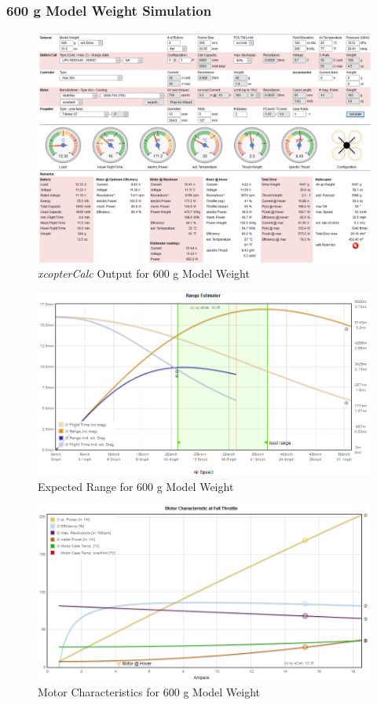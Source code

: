 \subsubsection{600 g Model Weight Simulation}

\begin{figure}[H]
\centering
\includegraphics[width=16.5cm]{img/600g_sim.png}
\caption{\textit{xcopterCalc} Output for 600 g Model Weight}
\end{figure} 

\begin{figure}[H]
\centering
\includegraphics[width=16.5cm]{img/600g_range.png}
\caption{Expected Range for 600 g Model Weight}
\end{figure} 

\begin{figure}[H]
\centering
\includegraphics[width=16.5cm]{img/600g_motor.png}
\caption{Motor Characteristics for 600 g Model Weight}
\end{figure} 
\clearpage

